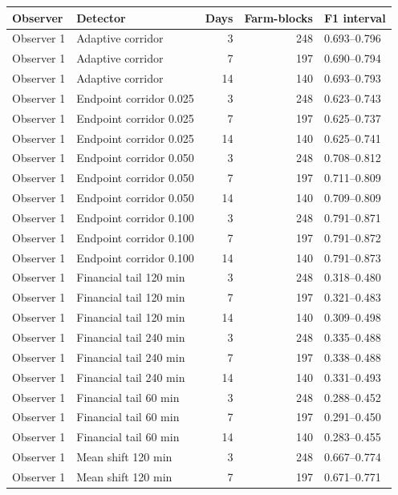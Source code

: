 \documentclass[a4paper,11pt]{article}
\newcounter{none}
\begin{document}
{\def\LTcaptype{none} %
\begin{longtable}[]{@{}llrrl@{}}
\toprule\noalign{}
Observer & Detector & Days & Farm-blocks & F1 interval \\
\midrule\noalign{}
\endhead
\bottomrule\noalign{}
\endlastfoot
Observer 1 & Adaptive corridor & 3 & 248 & 0.693--0.796 \\
Observer 1 & Adaptive corridor & 7 & 197 & 0.690--0.794 \\
Observer 1 & Adaptive corridor & 14 & 140 & 0.693--0.793 \\
Observer 1 & Endpoint corridor 0.025 & 3 & 248 & 0.623--0.743 \\
Observer 1 & Endpoint corridor 0.025 & 7 & 197 & 0.625--0.737 \\
Observer 1 & Endpoint corridor 0.025 & 14 & 140 & 0.625--0.741 \\
Observer 1 & Endpoint corridor 0.050 & 3 & 248 & 0.708--0.812 \\
Observer 1 & Endpoint corridor 0.050 & 7 & 197 & 0.711--0.809 \\
Observer 1 & Endpoint corridor 0.050 & 14 & 140 & 0.709--0.809 \\
Observer 1 & Endpoint corridor 0.100 & 3 & 248 & 0.791--0.871 \\
Observer 1 & Endpoint corridor 0.100 & 7 & 197 & 0.791--0.872 \\
Observer 1 & Endpoint corridor 0.100 & 14 & 140 & 0.791--0.873 \\
Observer 1 & Financial tail 120 min & 3 & 248 & 0.318--0.480 \\
Observer 1 & Financial tail 120 min & 7 & 197 & 0.321--0.483 \\
Observer 1 & Financial tail 120 min & 14 & 140 & 0.309--0.498 \\
Observer 1 & Financial tail 240 min & 3 & 248 & 0.335--0.488 \\
Observer 1 & Financial tail 240 min & 7 & 197 & 0.338--0.488 \\
Observer 1 & Financial tail 240 min & 14 & 140 & 0.331--0.493 \\
Observer 1 & Financial tail 60 min & 3 & 248 & 0.288--0.452 \\
Observer 1 & Financial tail 60 min & 7 & 197 & 0.291--0.450 \\
Observer 1 & Financial tail 60 min & 14 & 140 & 0.283--0.455 \\
Observer 1 & Mean shift 120 min & 3 & 248 & 0.667--0.774 \\
Observer 1 & Mean shift 120 min & 7 & 197 & 0.671--0.771 \\

\end{longtable}}
\end{document}
